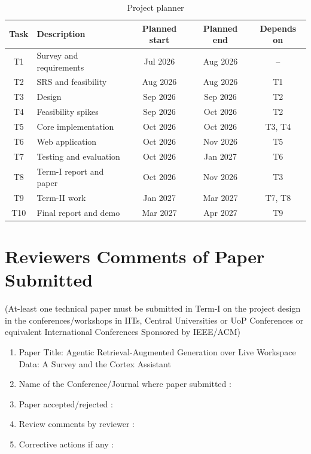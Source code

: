 \documentclass[oneside,a4paper,12pt]{report}
\begin{document}
\begin{appendices}
\begin{table}[!htbp]
\begin{center}
\def\arraystretch{1.25}
\small
\begin{tabularx}{\textwidth}{| c | X | c | c | c |}
\hline
Task & Description & Planned start & Planned end & Depends on \\ \hline
T1 & Survey and requirements & Jul 2026 & Aug 2026 & -- \\ \hline
T2 & SRS and feasibility & Aug 2026 & Aug 2026 & T1 \\ \hline
T3 & Design & Sep 2026 & Sep 2026 & T2 \\ \hline
T4 & Feasibility spikes & Sep 2026 & Oct 2026 & T2 \\ \hline
T5 & Core implementation & Oct 2026 & Oct 2026 & T3, T4 \\ \hline
T6 & Web application & Oct 2026 & Nov 2026 & T5 \\ \hline
T7 & Testing and evaluation & Oct 2026 & Jan 2027 & T6 \\ \hline
T8 & Term-I report and paper & Oct 2026 & Nov 2026 & T3 \\ \hline
T9 & Term-II work & Jan 2027 & Mar 2027 & T7, T8 \\ \hline
T10 & Final report and demo & Mar 2027 & Apr 2027 & T9 \\ \hline
\end{tabularx}
\end{center}
\caption{Project planner}
\label{tab:planner}
\end{table}




\chapter{Reviewers Comments of Paper Submitted}
(At-least one technical paper must be submitted in Term-I on the project design in the
conferences/workshops in IITs, Central Universities or UoP Conferences or equivalent International Conferences Sponsored by IEEE/ACM)
\begin{enumerate}
\item Paper Title: Agentic Retrieval-Augmented Generation over Live Workspace Data: A Survey and the Cortex Assistant
\item Name of the Conference/Journal where paper submitted :
\item Paper accepted/rejected :
\item Review comments by reviewer :
\item Corrective actions if any :


\end{enumerate}
\end{appendices}
\end{document}
